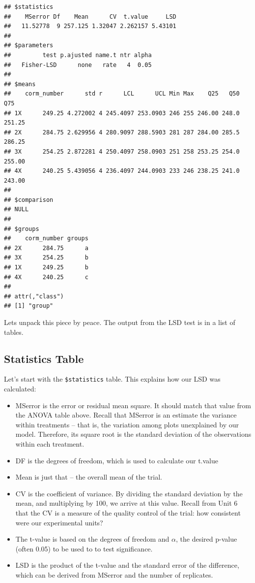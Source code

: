 \documentclass[
]{book}
\begin{document}
\begin{verbatim}
## $statistics
##    MSerror Df    Mean      CV  t.value     LSD
##   11.52778  9 257.125 1.32047 2.262157 5.43101
## 
## $parameters
##         test p.ajusted name.t ntr alpha
##   Fisher-LSD      none   rate   4  0.05
## 
## $means
##    corm_number      std r      LCL      UCL Min Max    Q25   Q50    Q75
## 1X      249.25 4.272002 4 245.4097 253.0903 246 255 246.00 248.0 251.25
## 2X      284.75 2.629956 4 280.9097 288.5903 281 287 284.00 285.5 286.25
## 3X      254.25 2.872281 4 250.4097 258.0903 251 258 253.25 254.0 255.00
## 4X      240.25 5.439056 4 236.4097 244.0903 233 246 238.25 241.0 243.00
## 
## $comparison
## NULL
## 
## $groups
##    corm_number groups
## 2X      284.75      a
## 3X      254.25      b
## 1X      249.25      b
## 4X      240.25      c
## 
## attr(,"class")
## [1] "group"
\end{verbatim}

Lets unpack this piece by peace. The output from the LSD test is in a list of tables.

\hypertarget{statistics-table}{%
\subsection{Statistics Table}\label{statistics-table}}

Let's start with the \texttt{\$statistics} table. This explains how our LSD was calculated:

\begin{itemize}
\item
  MSerror is the error or residual mean square. It should match that value from the ANOVA table above. Recall that MSerror is an estimate the variance within treatments -- that is, the variation among plots unexplained by our model. Therefore, its square root is the standard deviation of the observations within each treatment.
\item
  DF is the degrees of freedom, which is used to calculate our t.value
\item
  Mean is just that -- the overall mean of the trial.
\item
  CV is the coefficient of variance. By dividing the standard deviation by the mean, and multiplying by 100, we arrive at this value. Recall from Unit 6 that the CV is a measure of the quality control of the trial: how consistent were our experimental units?
\item
  The t-value is based on the degrees of freedom and \(\alpha\), the desired p-value (often 0.05) to be used to to test significance.
\item
  LSD is the product of the t-value and the standard error of the difference, which can be derived from MSerror and the number of replicates.
\end{itemize}
\end{document}
